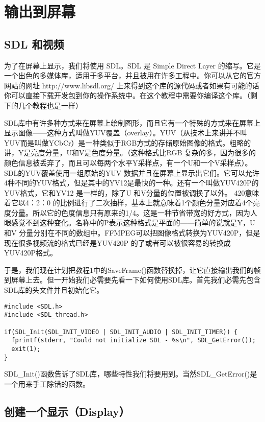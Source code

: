 ﻿\chapter{输出到屏幕}
\label{ch2}
\section{SDL 和视频}
为了在屏幕上显示，我们将使用 SDL。SDL 是 Simple Direct Layer 的缩写。它是一个出色的多媒体库，适用于多平台，并且被用在许多工程中。你可以从它的官方网站的网址 http://www.libsdl.org/ 上来得到这个库的源代码或者如果有可能的话你可以直接下载开发包到你的操作系统中。在这个教程中需要你编译这个库。（剩下的几个教程也是一样）

SDL库中有许多种方式来在屏幕上绘制图形，而且它有一个特殊的方式来在屏幕上显示图像——这种方式叫做YUV覆盖（overlay）。YUV（从技术上来讲并不叫YUV而是叫做YCbCr）是一种类似于RGB方式的存储原始图像的格式。粗略的讲，Y是亮度分量，U和V是色度分量。（这种格式比RGB 复杂的多，因为很多的颜色信息被丢弃了，而且可以每两个水平Y采样点，有一个U和一个V采样点）。SDL的YUV覆盖使用一组原始的YUV 数据并且在屏幕上显示出它们。它可以允许4种不同的YUV格式，但是其中的YV12是最快的一种。还有一个叫做YUV420P的YUV格式，它和YV12 是一样的，除了U 和V分量的位置被调换了以外。 420意味着它以4：2：0 的比例进行了二次抽样，基本上就意味着1个颜色分量对应着4个亮度分量。所以它的色度信息只有原来的1/4。这是一种节省带宽的好方式，因为人眼感觉不到这种变化。名称中的P表示这种格式是平面的——简单的说就是Y，U和V 分量分别在不同的数组中。FFMPEG可以把图像格式转换为YUV420P，但是现在很多视频流的格式已经是YUV420P 的了或者可以被很容易的转换成YUV420P格式。

于是，我们现在计划把教程1中的SaveFrame()函数替换掉，让它直接输出我们的帧到屏幕上去。但一开始我们必需要先看一下如何使用SDL库。首先我们必需先包含SDL库的头文件并且初始化它。

\begin{lstlisting}
#include <SDL.h>
#include <SDL_thread.h>

if(SDL_Init(SDL_INIT_VIDEO | SDL_INIT_AUDIO | SDL_INIT_TIMER)) {
  fprintf(stderr, "Could not initialize SDL - %s\n", SDL_GetError());
  exit(1);
}
\end{lstlisting}

SDL_Init()函数告诉了SDL库，哪些特性我们将要用到。当然SDL_GetError()是一个用来手工除错的函数。

\section{创建一个显示（Display）}

